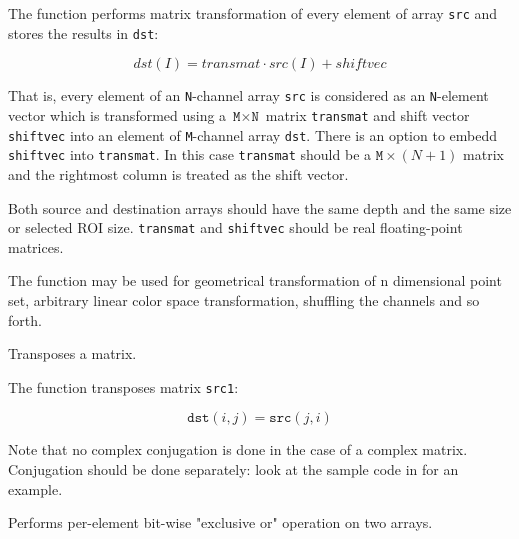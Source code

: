 \begin{description}
\end{description}

The function performs matrix transformation of every element of array \texttt{src} and stores the results in \texttt{dst}:

\[
dst(I) = transmat \cdot src(I) + shiftvec %
\]

That is, every element of an \texttt{N}-channel array \texttt{src} is
considered as an \texttt{N}-element vector which is transformed using
a $\texttt{M} \times \texttt{N}$ matrix \texttt{transmat} and shift
vector \texttt{shiftvec} into an element of \texttt{M}-channel array
\texttt{dst}. There is an option to embedd \texttt{shiftvec} into
\texttt{transmat}. In this case \texttt{transmat} should be a $\texttt{M}
\times (N+1)$ matrix and the rightmost column is treated as the shift
vector.

Both source and destination arrays should have the same depth and the
same size or selected ROI size. \texttt{transmat} and \texttt{shiftvec}
should be real floating-point matrices.

The function may be used for geometrical transformation of n dimensional
point set, arbitrary linear color space transformation, shuffling the
channels and so forth.

Transposes a matrix.


\begin{description}
\end{description}

The function transposes matrix \texttt{src1}:

\[ \texttt{dst}(i,j) = \texttt{src}(j,i) \]

Note that no complex conjugation is done in the case of a complex
matrix. Conjugation should be done separately: look at the sample code
in  for an example.

Performs per-element bit-wise "exclusive or" operation on two arrays.


